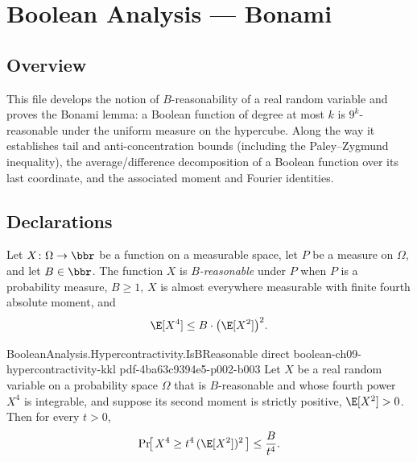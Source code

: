 \chapter{Boolean Analysis — Bonami}
\section{Overview}

This file develops the notion of $B$-reasonability of a real random variable and proves
the Bonami lemma: a Boolean function of degree at most $k$ is $9^{k}$-reasonable under the
uniform measure on the hypercube. Along the way it establishes tail and anti-concentration
bounds (including the Paley--Zygmund inequality), the average/difference decomposition of a
Boolean function over its last coordinate, and the associated moment and Fourier identities.

\section{Declarations}

\begin{definition}
\label{BooleanAnalysis.Hypercontractivity.IsBReasonable}
\leanok
{}
Let $X\colon\Omega\to\bbr$ be a function on a measurable space, let $P$ be a measure
on $\Omega$, and let $B\in\bbr$. The function $X$ is \emph{$B$-reasonable} under $P$
when $P$ is a probability measure, $B\ge1$, $X$ is almost everywhere measurable with
finite fourth absolute moment, and
\[
\E[X^4] \le B \cdot \bigl(\E[X^2]\bigr)^2 .
\]
\end{definition}

\begin{lemma}
\label{BooleanAnalysis.Hypercontractivity.b_reasonable_tail_bound}
\leanok
{}
\proofstep
  {BooleanAnalysis.Hypercontractivity.IsBReasonable}
  {direct}
  {boolean-ch09-hypercontractivity-kkl}
  {pdf-4ba63c9394e5-p002-b003}
Let $X$ be a real random variable on a probability space $\Omega$ that is $B$-reasonable
and whose fourth power $X^4$ is integrable, and suppose its second moment is strictly
positive, $\E[X^2] > 0$. Then for every $t > 0$,
\[
\Pr\!\bigl[\, X^4 \ge t^4\,(\E[X^2])^2 \,\bigr] \le \frac{B}{t^4}.
\]
\end{lemma}

